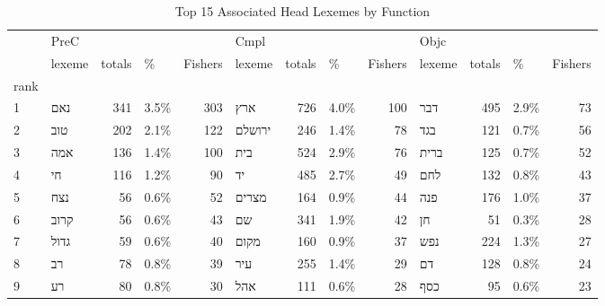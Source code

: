 \begin{table}[htbp!]
\centering
\caption{Top 15 Associated Head Lexemes by Function}
\label{table:pco_lexs}
\begin{adjustbox}{width=1\textwidth}
\begin{tabular}{llrlrlrlrlrlr}
\toprule
{} & \multicolumn{4}{l}{PreC} & \multicolumn{4}{l}{Cmpl} & \multicolumn{4}{l}{Objc} \\
{} &             lexeme & totals &     \% & Fishers &               lexeme & totals &     \% & Fishers &             lexeme & totals &     \% & Fishers \\
rank &                    &        &       &         &                      &        &       &         &                    &        &       &         \\
\midrule
1    &   \texthebrew{נאם} &    341 &  3.5\% &     303 &     \texthebrew{ארץ} &    726 &  4.0\% &     100 &   \texthebrew{דבר} &    495 &  2.9\% &      73 \\
2    &   \texthebrew{טוב} &    202 &  2.1\% &     122 &  \texthebrew{ירושלם} &    246 &  1.4\% &      78 &   \texthebrew{בגד} &    121 &  0.7\% &      56 \\
3    &   \texthebrew{אמה} &    136 &  1.4\% &     100 &     \texthebrew{בית} &    524 &  2.9\% &      76 &  \texthebrew{ברית} &    125 &  0.7\% &      52 \\
4    &    \texthebrew{חי} &    116 &  1.2\% &      90 &      \texthebrew{יד} &    485 &  2.7\% &      49 &   \texthebrew{לחם} &    132 &  0.8\% &      43 \\
5    &   \texthebrew{נצח} &     56 &  0.6\% &      52 &   \texthebrew{מצרים} &    164 &  0.9\% &      44 &   \texthebrew{פנה} &    176 &  1.0\% &      37 \\
6    &  \texthebrew{קרוב} &     56 &  0.6\% &      43 &      \texthebrew{שם} &    341 &  1.9\% &      42 &    \texthebrew{חן} &     51 &  0.3\% &      28 \\
7    &  \texthebrew{גדול} &     59 &  0.6\% &      40 &    \texthebrew{מקום} &    160 &  0.9\% &      37 &   \texthebrew{נפש} &    224 &  1.3\% &      27 \\
8    &    \texthebrew{רב} &     78 &  0.8\% &      39 &     \texthebrew{עיר} &    255 &  1.4\% &      29 &    \texthebrew{דם} &    128 &  0.8\% &      24 \\
9    &    \texthebrew{רע} &     80 &  0.8\% &      30 &     \texthebrew{אהל} &    111 &  0.6\% &      28 &   \texthebrew{כסף} &     95 &  0.6\% &      23 \\

\end{tabular}
\end{adjustbox}
\end{table}
